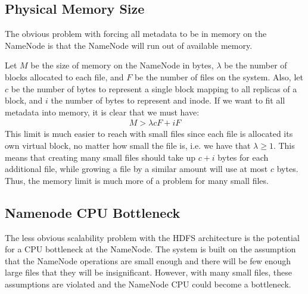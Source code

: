 \documentclass[11pt, a4paper]{article}
\begin{document}
\begin{multicols*}{2}
\subsection{Physical Memory Size}




The obvious problem with forcing all metadata to be in memory on the NameNode is that the NameNode will run out of available memory. %

Let $ M $ be the size of memory on the NameNode in bytes, $ \lambda $ be the number of blocks allocated to each file, and $ F $ be the number of files on the system. Also, let $ c $ be the number of bytes to represent a single block mapping to all replicas of a block, and $ i $ the number of bytes to represent and inode. If we want to fit all metadata into memory, it is clear that we must have:
\begin{align*}
	M > \lambda c F + i F
\end{align*}
	This limit is much easier to reach with small files since each file is allocated its own virtual block, no matter how small the file is, i.e. we have that $ \lambda \geq 1$. This means that creating many small files should take up $ c + i$ bytes for each additional file, while growing a file by a similar amount will use at most $ c $ bytes. Thus, the memory limit is much more of a problem for many small files. 


\subsection{Namenode CPU Bottleneck}

The less obvious scalability problem with the HDFS architecture is the potential for a CPU bottleneck at the NameNode. The system is built on the assumption that the NameNode operations are small enough and there will be few enough large files that they will be insignificant. However, with many small files, these assumptions are violated and the NameNode CPU could become a bottleneck. 


\end{multicols*}
\end{document}
